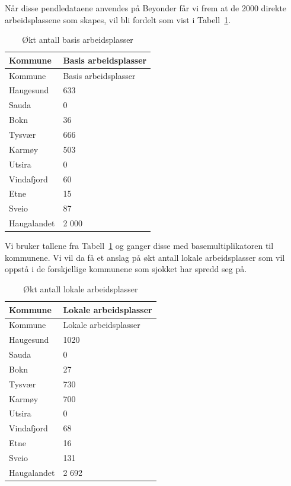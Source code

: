 \documentclass[
]{article}
\begin{document}
Når disse pendledataene anvendes på Beyonder får vi frem at de 2000
direkte arbeidsplassene som skapes, vil bli fordelt som vist i
Tabell~\ref{tbl-direkte}.

\hypertarget{tbl-direkte}{}
\begin{longtable}[]{@{}ll@{}}
\caption{\label{tbl-direkte}Økt antall basis arbeidsplasser
}\tabularnewline
\toprule()
Kommune & Basis arbeidsplasser \\
\midrule()
\endfirsthead
\toprule()
Kommune & Basis arbeidsplasser \\
\midrule()
\endhead
Haugesund & 633 \\
Sauda & 0 \\
Bokn & 36 \\
Tysvær & 666 \\
Karmøy & 503 \\
Utsira & 0 \\
Vindafjord & 60 \\
Etne & 15 \\
Sveio & 87 \\
Haugalandet & 2 000 \\
\bottomrule()
\end{longtable}

Vi bruker tallene fra Tabell~\ref{tbl-direkte} og ganger disse med
basemultiplikatoren til kommunene. Vi vil da få et anslag på økt antall
lokale arbeidsplasser som vil oppstå i de forskjellige kommunene som
sjokket har spredd seg på.

\hypertarget{tbl-indirekte}{}
\begin{longtable}[]{@{}ll@{}}
\caption{\label{tbl-indirekte}Økt antall lokale arbeidsplasser
}\tabularnewline
\toprule()
Kommune & Lokale arbeidsplasser \\
\midrule()
\endfirsthead
\toprule()
Kommune & Lokale arbeidsplasser \\
\midrule()
\endhead
Haugesund & 1020 \\
Sauda & 0 \\
Bokn & 27 \\
Tysvær & 730 \\
Karmøy & 700 \\
Utsira & 0 \\
Vindafjord & 68 \\
Etne & 16 \\
Sveio & 131 \\
Haugalandet & 2 692 \\
\bottomrule()
\end{longtable}
\end{document}
